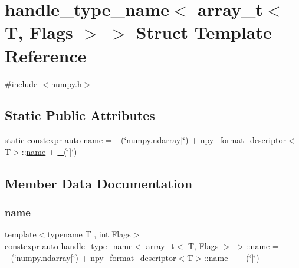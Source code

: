 \hypertarget{structhandle__type__name_3_01array__t_3_01_t_00_01_flags_01_4_01_4}{}\section{handle\+\_\+type\+\_\+name$<$ array\+\_\+t$<$ T, Flags $>$ $>$ Struct Template Reference}
\label{structhandle__type__name_3_01array__t_3_01_t_00_01_flags_01_4_01_4}


{\ttfamily \#include $<$numpy.\+h$>$}

\subsection*{Static Public Attributes}
\begin{DoxyCompactItemize}
\item 
static constexpr auto \mbox{\hyperlink{structhandle__type__name_3_01array__t_3_01_t_00_01_flags_01_4_01_4_ac2bb138173acae2d7915b3a51d0e39c2}{name}} = \mbox{\hyperlink{descr_8h_af114703e20c6527e87163eb2798f74b8}{\+\_\+}}(\char`\"{}numpy.\+ndarray\mbox{[}\char`\"{}) + npy\+\_\+format\+\_\+descriptor$<$T$>$\+::\mbox{\hyperlink{structname}{name}} + \mbox{\hyperlink{descr_8h_af114703e20c6527e87163eb2798f74b8}{\+\_\+}}(\char`\"{}\mbox{]}\char`\"{})
\end{DoxyCompactItemize}


\subsection{Member Data Documentation}
\mbox{\label{structhandle__type__name_3_01array__t_3_01_t_00_01_flags_01_4_01_4_ac2bb138173acae2d7915b3a51d0e39c2}} 
\subsubsection{\texorpdfstring{name}{name}}
{\footnotesize\ttfamily template$<$typename T , int Flags$>$ \\
constexpr auto \mbox{\hyperlink{structhandle__type__name}{handle\+\_\+type\+\_\+name}}$<$ \mbox{\hyperlink{classarray__t}{array\+\_\+t}}$<$ T, Flags $>$ $>$\+::\mbox{\hyperlink{structname}{name}} = \mbox{\hyperlink{descr_8h_af114703e20c6527e87163eb2798f74b8}{\+\_\+}}(\char`\"{}numpy.\+ndarray\mbox{[}\char`\"{}) + npy\+\_\+format\+\_\+descriptor$<$T$>$\+::\mbox{\hyperlink{structname}{name}} + \mbox{\hyperlink{descr_8h_af114703e20c6527e87163eb2798f74b8}{\+\_\+}}(\char`\"{}\mbox{]}\char`\"{})\hspace{0.3cm}{\ttfamily [static]}}



